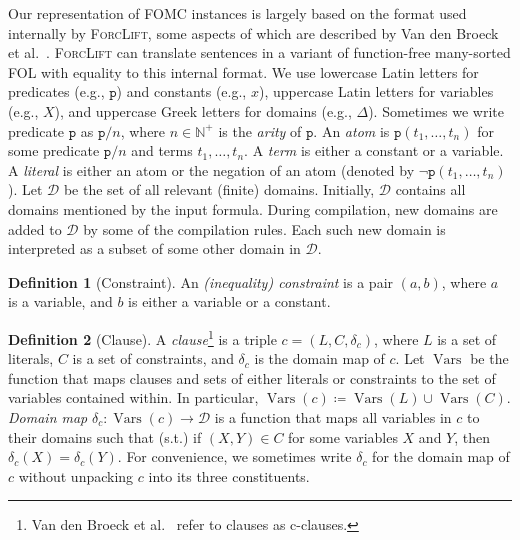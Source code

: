 \documentclass{article}
\theoremstyle{definition}
\newtheorem{definition}{Definition}
\DeclareMathOperator{\Vars}{Vars}
\begin{document}
Our representation of FOMC instances is largely based on the format used
internally by \textsc{ForcLift}, some aspects of which are described by Van den
Broeck et al.~. \textsc{ForcLift} can
translate sentences in a variant of function-free many-sorted FOL with equality
to this internal format. We use lowercase Latin letters for predicates (e.g.,
$\texttt{p}$) and constants (e.g., $x$), uppercase Latin letters for variables
(e.g., $X$), and uppercase Greek letters for domains (e.g., $\Delta$). Sometimes
we write predicate $\texttt{p}$ as $\texttt{p}/n$, where $n \in \mathbb{N}^{+}$
is the \emph{arity} of $\texttt{p}$. An \emph{atom} is
$\texttt{p}(t_1, \dots, t_n)$ for some predicate $\texttt{p}/n$ and terms
$t_{1}, \dots, t_{n}$. A \emph{term} is either a constant or a variable. A
\emph{literal} is either an atom or the negation of an atom (denoted by
$\neg \texttt{p}(t_1, \dots, t_n)$). Let $\mathcal{D}$ be the set of all
relevant (finite) domains. Initially, $\mathcal{D}$ contains all domains
mentioned by the input formula. During compilation, new domains are added to
$\mathcal{D}$ by some of the compilation rules. Each such new domain is
interpreted as a subset of some other domain in $\mathcal{D}$.

\begin{definition}[Constraint]\label{def:constraint}
  An \emph{(inequality) constraint} is a pair $(a, b)$, where $a$ is a variable,
  and $b$ is either a variable or a constant.
\end{definition}

\begin{definition}[Clause]\label{def:clause}
  A \emph{clause}\footnote{Van den Broeck et
    al.~ refer to clauses as c-clauses.}
  is a triple $c = (L, C, \delta_c)$, where $L$ is a set of literals, $C$ is a
  set of constraints, and $\delta_c$ is the domain map of $c$. Let $\Vars$ be
  the function that maps clauses and sets of either literals or constraints to
  the set of variables contained within. In particular,
  $\Vars(c) \coloneqq \Vars(L) \cup \Vars(C)$. \emph{Domain map}
  $\delta_{c}\colon \Vars(c) \to \mathcal{D}$ is a function that maps all
  variables in $c$ to their domains such that (s.t.) if $(X, Y) \in C$ for some
  variables $X$ and $Y$, then $\delta_c(X) = \delta_c(Y)$. For convenience, we
  sometimes write $\delta_c$ for the domain map of $c$ without unpacking $c$
  into its three constituents.
\end{definition}
\end{document}
